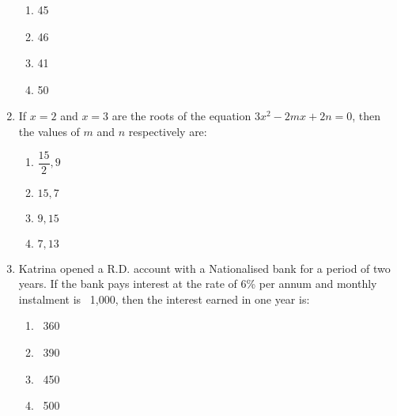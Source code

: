 \begin{enumerate}[label=(\roman*)]
        \begin{multicols}{2}
        \begin{enumerate}[label=(\alph*)]
            \item 45
            \item 46
            \item 41
            \item 50
        \end{enumerate}
        \end{multicols}

    \newpage
    \item If $x=2$ and $x=3$ are the roots of the equation $3x^2 - 2mx + 2n = 0$, then 
        the values of $m$ and $n$ respectively are:

        \begin{multicols}{2}
        \begin{enumerate}[label=(\alph*)]
            \item $\dfrac{15}{2}, 9$
            \item $15, 7$
            \item $9, 15$
            \item $7, 13$
        \end{enumerate}
        \end{multicols}

    \item Katrina opened a R.D. account with a Nationalised bank for a period 
        of two years. If the bank pays interest at the rate of 6\% per annum 
        and monthly instalment is \rupee~1,000, then the interest earned 
        in one year is:

        \begin{multicols}{2}
        \begin{enumerate}[label=(\alph*)]
            \item \rupee~360
            \item \rupee~390
            \item \rupee~450
            \item \rupee~500
        \end{enumerate}
        \end{multicols}

\end{enumerate}

